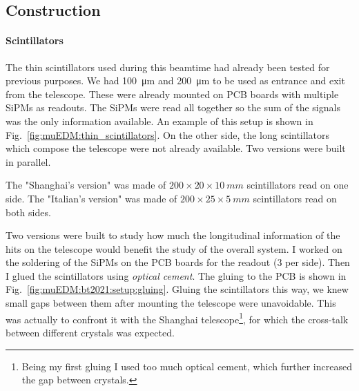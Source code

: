 \begin{refsection}
    \subsection{Construction}
        
        \paragraph{Scintillators}
        The thin scintillators used during this beamtime had already been tested for previous purposes. 
        We had \SI{100}{\micro m} and \SI{200}{\micro m} to be used as entrance and exit from the telescope.
        These were already mounted on PCB boards with multiple SiPMs as readouts. The SiPMs were read all together so the sum of the signals was the only information available.
        An example of this setup is shown in Fig.~\ref{fig:muEDM:thin_scintillators}.
        On the other side, the long scintillators which compose the telescope were not already available.
        Two versions were built in parallel.
        \begin{outline}
            \1 The "Shanghai's version" was made of $200\times 20\times\SI{10}{mm}$ scintillators read on one side.
            \1 The "Italian's version" was made of $200\times 25\times\SI{5}{mm}$ scintillators read on both sides.
        \end{outline}
        Two versions were built to study how much the longitudinal information of the hits on the telescope would benefit the study of the overall system.
        I worked on the soldering of the SiPMs on the PCB boards for the readout (3 per side).
        Then I glued the scintillators using \textit{optical cement}.
        The gluing to the PCB is shown in Fig.~\ref{fig:muEDM:bt2021:setup:gluing}.
        Gluing the scintillators this way, we knew small gaps between them after mounting the telescope were unavoidable. 
        This was actually to confront it with the Shanghai telescope\footnote{Being my first gluing I used too much optical cement, which further increased the gap between crystals.}, for which the cross-talk between different crystals was expected.


\end{refsection}
